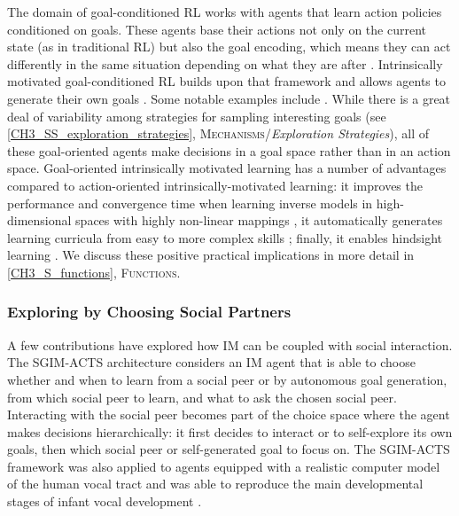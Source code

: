 The domain of goal-conditioned RL works with agents that learn action policies conditioned on goals. These agents base their actions not only on the current state (as in traditional RL) but also the goal encoding, which means they can act differently in the same situation depending on what they are after \parencite{schaul_prioritized_2016}. Intrinsically motivated goal-conditioned RL builds upon that framework and allows agents to generate their own goals \parencite[see][for a recent review]{colas_intrinsically_2021}. Some notable examples include \parencite{colas_gep-pg_2018,nair_visual_2018,colas_curious_2019,pong_skew-fit_2020,colas_language_2020}. While there is a great deal of variability among strategies for sampling interesting goals (see \cref{CH3_SS_exploration_strategies}, \textsc{Mechanisms}/\textit{Exploration Strategies}), all of these goal-oriented agents make decisions in a goal space rather than in an action space. Goal-oriented intrinsically motivated learning has a number of advantages compared to action-oriented intrinsically-motivated learning: it improves the performance and convergence time when learning inverse models in high-dimensional spaces with highly non-linear mappings \parencite{baranes_active_2013}, it automatically generates learning curricula from easy to more complex skills \parencite{moulin-frier_self-organization_2014}; finally, it enables hindsight learning \parencite{forestier_intrinsically_2020,andrychowicz_hindsight_2018,colas_curious_2019}. We discuss these positive practical implications in more detail in \cref{CH3_S_functions}, \textsc{Functions}.

\subsubsection{Exploring by Choosing Social Partners}\label{CH3_SSS_exploring_by_choosing_social_partners}
A few contributions have explored how IM can be coupled with social interaction. The SGIM-ACTS architecture \parencite{nguyen_active_2012} considers an IM agent that is able to choose whether and when to learn from a social peer or by autonomous goal generation, from which social peer to learn, and what to ask the chosen social peer. Interacting with the social peer becomes part of the choice space where the agent makes decisions hierarchically: it first decides to interact or to self-explore its own goals, then which social peer or self-generated goal to focus on. The SGIM-ACTS framework was also applied to agents equipped with a realistic computer model of the human vocal tract and was able to reproduce the main developmental stages of infant vocal development \parencite{moulin-frier_self-organization_2014}.

